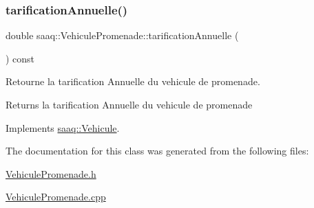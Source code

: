 \subsubsection{\texorpdfstring{tarification\+Annuelle()}{tarificationAnnuelle()}}
{\footnotesize\ttfamily double saaq\+::\+Vehicule\+Promenade\+::tarification\+Annuelle (\begin{DoxyParamCaption}{ }\end{DoxyParamCaption}) const\hspace{0.3cm}{\ttfamily [virtual]}}



Retourne la tarification Annuelle du vehicule de promenade. 

\begin{DoxyReturn}{Returns}
la tarification Annuelle du vehicule de promenade 
\end{DoxyReturn}


Implements \hyperlink{classsaaq_1_1Vehicule_a93570921069d25b6bc48cf04af176395}{saaq\+::\+Vehicule}.



The documentation for this class was generated from the following files\+:\begin{DoxyCompactItemize}
\item 
\hyperlink{VehiculePromenade_8h}{Vehicule\+Promenade.\+h}\item 
\hyperlink{VehiculePromenade_8cpp}{Vehicule\+Promenade.\+cpp}\end{DoxyCompactItemize}
